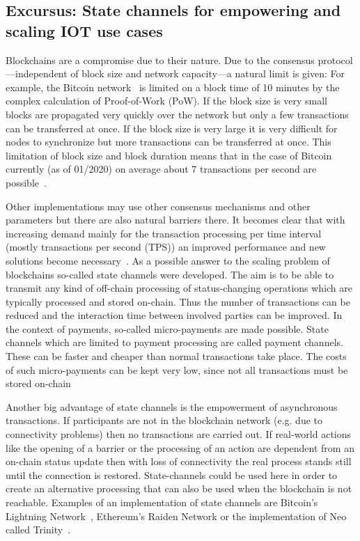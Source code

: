 \documentclass[conference]{IEEEtran}
\begin{document}
%
\subsection{Excursus: State channels for empowering and scaling IOT use cases}

Blockchains are a compromise due to their nature. Due to the consensus protocol---independent of block size and network capacity---a natural limit is given: For example, the Bitcoin network~\cite{nakamoto2009} is limited on a block time of 10 minutes by the complex calculation of Proof-of-Work (PoW). If the block size is very small blocks are propagated very quickly over the network but only a few transactions can be transferred at once. If the block size is very large it is very difficult for nodes to synchronize but more transactions can be transferred at once. This limitation of block size and block duration means that in the case of Bitcoin currently (as of 01/2020) on average about 7 transactions per second are possible~\cite{Macdonald2017}.

Other implementations may use other consensus mechanisms and other parameters but there are also natural barriers there. It becomes clear that with increasing demand mainly for the transaction processing per time interval (mostly transactions per second (TPS)) an improved performance and new solutions become necessary~\cite{Macdonald2017}. As a possible answer to the scaling problem of blockchains so-called state channels were developed. The aim is to be able to transmit any kind of off-chain processing of status-changing operations which are typically processed and stored on-chain. Thus the number of transactions can be reduced and the interaction time between involved parties can be improved. In the context of payments, so-called micro-payments are made possible. State channels which are limited to payment processing are called payment channels. These can be faster and cheaper than normal transactions take place. The costs of such micro-payments can be kept very low, since not all transactions must be stored on-chain~\cite{Coleman2018}

Another big advantage of state channels is the empowerment of asynchronous transactions. If participants are not in the blockchain network (e.g. due to connectivity problems) then no transactions are carried out. If real-world actions like the opening of a barrier or the processing of an action are dependent from an on-chain status update then with loss of connectivity the real process stands still until the connection is restored. State-channels could be used here in order to create an alternative processing that can also be used when the blockchain is not reachable. Examples of an implementation of state channels are Bitcoin's Lightning Network~\cite{Lightning2016}, Ethereum's Raiden Network or the implementation of Neo called Trinity~\cite{Trinity2018}.
\end{document}
